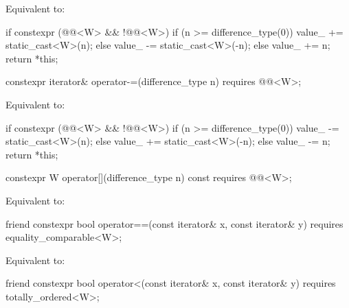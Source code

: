 \begin{itemdescr}
\pnum
\effects Equivalent to:
\begin{codeblock}
if constexpr (@@<W> && !@@<W>) {
  if (n >= difference_type(0))
    value_ += static_cast<W>(n);
  else
    value_ -= static_cast<W>(-n);
} else {
  value_ += n;
}
return *this;
\end{codeblock}
\end{itemdescr}

\begin{itemdecl}
constexpr iterator& operator-=(difference_type n)
  requires @@<W>;
\end{itemdecl}

\begin{itemdescr}
\pnum
\effects Equivalent to:
\begin{codeblock}
if constexpr (@@<W> && !@@<W>) {
  if (n >= difference_type(0))
    value_ -= static_cast<W>(n);
  else
    value_ += static_cast<W>(-n);
} else {
  value_ -= n;
}
return *this;
\end{codeblock}
\end{itemdescr}

\begin{itemdecl}
constexpr W operator[](difference_type n) const
  requires @@<W>;
\end{itemdecl}

\begin{itemdescr}
\pnum
\effects Equivalent to: 
\end{itemdescr}

\begin{itemdecl}
friend constexpr bool operator==(const iterator& x, const iterator& y)
  requires equality_comparable<W>;
\end{itemdecl}

\begin{itemdescr}
\pnum
\effects Equivalent to: 
\end{itemdescr}

\begin{itemdecl}
friend constexpr bool operator<(const iterator& x, const iterator& y)
  requires totally_ordered<W>;
\end{itemdecl}

